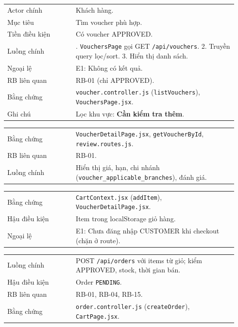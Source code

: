 \begin{longtable}{>{\raggedright\arraybackslash}p{0.28\linewidth}>{\raggedright\arraybackslash}p{0.66\linewidth}}
Actor chính & Khách hàng.\\
Mục tiêu & Tìm voucher phù hợp.\\
Tiền điều kiện & Có voucher APPROVED.\\
Luồng chính & 1. \texttt{VouchersPage} gọi GET \texttt{/api/vouchers}. 2. Truyền query lọc/sort. 3. Hiển thị danh sách.\\
Ngoại lệ & E1: Không có kết quả.\\
RB liên quan & RB-01 (chỉ APPROVED).\\
Bằng chứng & \texttt{voucher.controller.js} (\texttt{listVouchers}), \texttt{VouchersPage.jsx}.\\
Ghi chú & Lọc khu vực: \textbf{Cần kiểm tra thêm}.\\
\end{longtable}

\begin{longtable}{>{\raggedright\arraybackslash}p{0.28\linewidth}>{\raggedright\arraybackslash}p{0.66\linewidth}}
Bằng chứng & \texttt{VoucherDetailPage.jsx}, \texttt{getVoucherById}, \texttt{review.routes.js}.\\
RB liên quan & RB-01.\\
Luồng chính & Hiển thị giá, hạn, chi nhánh (\texttt{voucher\_applicable\_branches}), đánh giá.\\
\end{longtable}

\begin{longtable}{>{\raggedright\arraybackslash}p{0.28\linewidth}>{\raggedright\arraybackslash}p{0.66\linewidth}}
Bằng chứng & \texttt{CartContext.jsx} (\texttt{addItem}), \texttt{VoucherDetailPage.jsx}.\\
Hậu điều kiện & Item trong localStorage giỏ hàng.\\
Ngoại lệ & E1: Chưa đăng nhập CUSTOMER khi checkout (chặn ở route).\\
\end{longtable}

\begin{longtable}{>{\raggedright\arraybackslash}p{0.28\linewidth}>{\raggedright\arraybackslash}p{0.66\linewidth}}
Luồng chính & POST \texttt{/api/orders} với items từ giỏ; kiểm APPROVED, stock, thời gian bán.\\
Hậu điều kiện & Order \texttt{PENDING}.\\
RB liên quan & RB-01, RB-04, RB-15.\\
Bằng chứng & \texttt{order.controller.js} (\texttt{createOrder}), \texttt{CartPage.jsx}.\\
\end{longtable}

